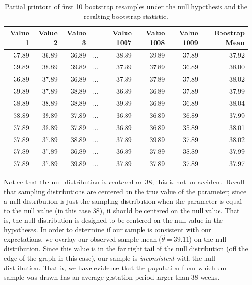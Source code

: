 \documentclass[]{book}
\theoremstyle{plain}
\theoremstyle{mydefn}
\theoremstyle{myexmpl}
\theoremstyle{remark}
\begin{document}
\begin{table}

\caption{\label{tab:singleteststat-bootstrap-mean}Partial printout of first 10 bootstrap resamples under the null hypothesis and the resulting bootstrap statistic.}
\centering
\begin{tabular}[t]{r|r|r|l|r|r|r|r}
\hline
Value 1 & Value 2 & Value 3 &         & Value 1007 & Value 1008 & Value 1009 & Boostrap Mean\\
\hline
37.89 & 36.89 & 36.89 & ... & 38.89 & 39.89 & 37.89 & 37.92\\
\hline
39.89 & 38.89 & 39.89 & ... & 37.89 & 37.89 & 36.89 & 38.00\\
\hline
36.89 & 37.89 & 36.89 & ... & 37.89 & 37.89 & 37.89 & 38.02\\
\hline
39.89 & 37.89 & 38.89 & ... & 36.89 & 36.89 & 37.89 & 37.99\\
\hline
38.89 & 38.89 & 38.89 & ... & 39.89 & 36.89 & 36.89 & 38.04\\
\hline
38.89 & 39.89 & 37.89 & ... & 36.89 & 36.89 & 36.89 & 37.99\\
\hline
37.89 & 38.89 & 37.89 & ... & 36.89 & 36.89 & 35.89 & 38.01\\
\hline
37.89 & 37.89 & 38.89 & ... & 37.89 & 39.89 & 37.89 & 38.02\\
\hline
37.89 & 37.89 & 36.89 & ... & 36.89 & 37.89 & 38.89 & 37.99\\
\hline
37.89 & 37.89 & 39.89 & ... & 37.89 & 37.89 & 37.89 & 37.97\\
\hline
\end{tabular}
\end{table}

Notice that the null distribution is centered on 38; this is not an
accident. Recall that sampling distributions are centered on the true
value of the parameter; since a null distribution is just the sampling
distribution when the parameter is equal to the null value (in this case
38), it should be centered on the null value. That is, the null
distribution is designed to be centered on the null value in the
hypotheses. In order to determine if our sample is consistent with our
expectations, we overlay our observed sample mean
(\(\widehat{\theta} = 39.11\)) on the null distribution. Since this
value is in the far right tail of the null distribution (off the edge of
the graph in this case), our sample is \emph{inconsistent} with the null
distribution. That is, we have evidence that the population from which
our sample was drawn has an average gestation period larger than 38
weeks.
\end{document}
